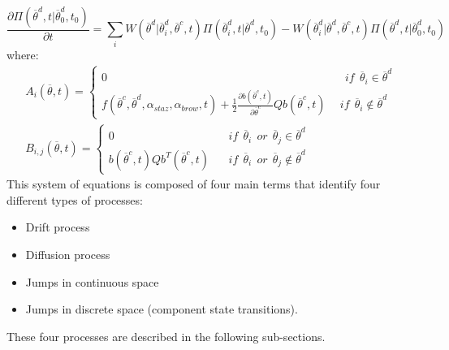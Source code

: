 \begin{equation}
\frac{\partial \Pi \left (\overline{\theta}^{d},t|\overline{\theta}_{0}^{d},t_{0}
\right ) }{\partial t} =
\sum_{i} W\left ( \overline{\theta}^{d}|
\overline{\theta}^{d}_{i},\overline{\theta}^{c},t \right ) \Pi \left (\overline{\theta}^{d}_{i},t|\overline{\theta}^{d},t_{0}
\right ) - W\left ( \overline{\theta}^{d}_{i}|
\overline{\theta}^{d},\overline{\theta}^{c},t \right ) \Pi \left (\overline{\theta}^{d},t|\overline{\theta}^{d}_{0},t_{0}
\right )
\end{equation}
where:
\begin{equation}
\begin{matrix}
A_{i}\left ( \overline{\theta}, t \right ) = \left\{\begin{matrix}
0 & \: \: if  \: \: \overline{\theta}_{i} \in \overline{\theta}^{d}
\\
f\left ( \overline{\theta}^{c},\overline{\theta}^{d},\alpha_{staz},\alpha_{brow},t \right ) +\frac{1}{2}\frac{\partial b\left ( \overline{\theta}^{c},t \right )}{\partial \overline{\theta}^{c}}Qb\left ( \overline{\theta}^{c},t \right ) \: \: & if  \: \: \overline{\theta}_{i} \notin \overline{\theta}^{d}
\end{matrix}\right.
\\
B_{i,j}\left ( \overline{\theta}, t \right ) = \left\{\begin{matrix}
0 & \: \: if  \: \: \overline{\theta}_{i} \: \: or \: \: \overline{\theta}_{j}  \in \overline{\theta}^{d}
\\
b\left ( \overline{\theta}^{c},t \right )Qb^{T}\left (  \overline{\theta}^{c},t \right ) \: \: & \: \: if  \: \: \overline{\theta}_{i} \: \: or \: \: \overline{\theta}_{j}  \notin \overline{\theta}^{d}
\end{matrix}\right.
\end{matrix}
\end{equation}
This system of equations is composed of four main terms that identify four different types of processes:
\begin{itemize}
  \item Drift process
  \item Diffusion process
  \item Jumps in continuous space
  \item Jumps in discrete space (component state transitions).
\end{itemize}
 These four processes are described in the following sub-sections.
%
%
%
%
